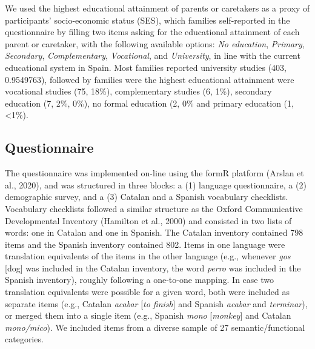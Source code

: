 \documentclass[
  letterpaper,
  DIV=11,
  numbers=noendperiod]{scrartcl}
\begin{document}
We used the highest educational attainment of parents or caretakers as a
proxy of participants' socio-economic status (SES), which families
self-reported in the questionnaire by filling two items asking for the
educational attainment of each parent or caretaker, with the following
available options: \emph{No education}, \emph{Primary},
\emph{Secondary}, \emph{Complementary}, \emph{Vocational}, and
\emph{University}, in line with the current educational system in Spain.
Most families reported university studies (403, 0.9549763), followed by
families were the highest educational attainment were vocational studies
(75, 18\%), complementary studies (6, 1\%), secondary education (7, 2\%,
0\%), no formal education (2, 0\% and primary education (1,
\textless1\%).

\hypertarget{questionnaire}{%
\subsection{Questionnaire}\label{questionnaire}}

The questionnaire was implemented on-line using the formR platform
(Arslan et al., 2020), and was structured in three blocks: a (1)
language questionnaire, a (2) demographic survey, and a (3) Catalan and
a Spanish vocabulary checklists. Vocabulary checklists followed a
similar structure as the Oxford Communicative Developmental Inventory
(Hamilton et al., 2000) and consisted in two lists of words: one in
Catalan and one in Spanish. The Catalan inventory contained 798 items
and the Spanish inventory contained 802. Items in one language were
translation equivalents of the items in the other language (e.g.,
whenever \emph{gos} {[}dog{]} was included in the Catalan inventory, the
word \emph{perro} was included in the Spanish inventory), roughly
following a one-to-one mapping. In case two translation equivalents were
possible for a given word, both were included as separate items (e.g.,
Catalan \emph{acabar} {[}\emph{to finish}{]} and Spanish \emph{acabar}
and \emph{terminar}), or merged them into a single item (e.g., Spanish
\emph{mono} {[}\emph{monkey}{]} and Catalan \emph{mono/mico}). We
included items from a diverse sample of 27 semantic/functional
categories.
\end{document}

